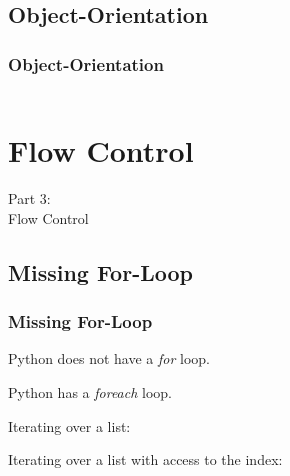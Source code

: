 \subsection{Object-Orientation}
\begin{frame}
    \frametitle{Object-Orientation}
    \vspace{2mm}
    
    \inputminted[fontsize=\small]{python}{../src/objectexample.py}
\end{frame}


\section{Flow Control}
\begin{frame}
    \vspace{25mm}
    \begin{center}
        \Huge{Part 3:\\Flow Control}
    \end{center}
\end{frame}

\subsection{Missing For-Loop}
\begin{frame}
    \frametitle{Missing For-Loop}
    \vspace{3mm}
    Python does not have a \textsl{for} loop.
    
    \pause
    \vspace{3mm}
    Python has a \textsl{foreach} loop.
    \pause
    
    \vspace{6mm}
    Iterating over a list:
    \vspace{3mm}
    \contentForI
    \pause
    
    \vspace{6mm}
    Iterating over a list with access to the index:
    \vspace{3mm}
    \contentForII
\end{frame}

